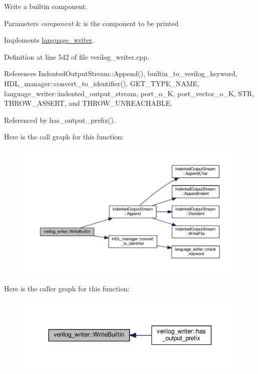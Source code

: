 Write a builtin component. 


\begin{DoxyParams}{Parameters}
{\em component} & is the component to be printed \\
\hline
\end{DoxyParams}


Implements \hyperlink{classlanguage__writer_a30538fe1dc72928281e409f7684ced83}{language\+\_\+writer}.



Definition at line 542 of file verilog\+\_\+writer.\+cpp.



References Indented\+Output\+Stream\+::\+Append(), builtin\+\_\+to\+\_\+verilog\+\_\+keyword, H\+D\+L\+\_\+manager\+::convert\+\_\+to\+\_\+identifier(), G\+E\+T\+\_\+\+T\+Y\+P\+E\+\_\+\+N\+A\+ME, language\+\_\+writer\+::indented\+\_\+output\+\_\+stream, port\+\_\+o\+\_\+K, port\+\_\+vector\+\_\+o\+\_\+K, S\+TR, T\+H\+R\+O\+W\+\_\+\+A\+S\+S\+E\+RT, and T\+H\+R\+O\+W\+\_\+\+U\+N\+R\+E\+A\+C\+H\+A\+B\+LE.



Referenced by has\+\_\+output\+\_\+prefix().

Here is the call graph for this function\+:
\nopagebreak
\begin{figure}[H]
\begin{center}
\leavevmode
\includegraphics[width=350pt]{d8/dba/classverilog__writer_ae6de8e08344d96fdc22cfef1974b59fa_cgraph}
\end{center}
\end{figure}
Here is the caller graph for this function\+:
\nopagebreak
\begin{figure}[H]
\begin{center}
\leavevmode
\includegraphics[width=343pt]{d8/dba/classverilog__writer_ae6de8e08344d96fdc22cfef1974b59fa_icgraph}
\end{center}
\end{figure}


